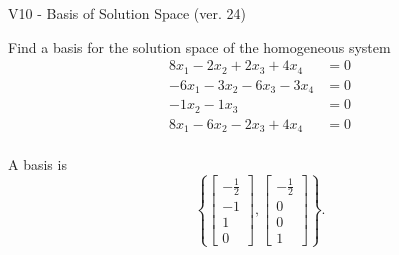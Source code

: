\begin{exercise}
  \begin{exerciseTitle}V10 - Basis of Solution Space (ver. 24)\end{exerciseTitle}
  \begin{exerciseStatement}
    Find a basis for the solution space of the homogeneous system 
\begin{align*}
 8 x_ 1 -2 x_ 2 + 2 x_ 3 + 4 x_ 4 &= 0  \\ 
  -6 x_ 1 -3 x_ 2 -6 x_ 3 -3 x_ 4 &= 0  \\ 
  -1 x_ 2 -1 x_ 3 &= 0  \\ 
  8 x_ 1 -6 x_ 2 -2 x_ 3 + 4 x_ 4 &= 0  \\ 
 \end{align*}


 
  \end{exerciseStatement}

  \begin{exerciseAnswer}
   A basis is   
\[\left\{\left[\begin{array}{c}
-\frac{1}{2} \\
-1 \\
1 \\
0
\end{array}\right] , \left[\begin{array}{c}
-\frac{1}{2} \\
0 \\
0 \\
1
\end{array}\right]\right\}.\]

  


  \end{exerciseAnswer}
\end{exercise}